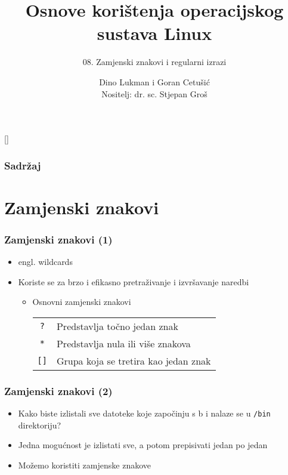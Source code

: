 \documentclass[table,usenames,dvipsnames]{beamer}
\title{Osnove korištenja operacijskog sustava Linux}
\subtitle{08. Zamjenski znakovi i regularni izrazi}
\author[Dino Lukman i Goran Cetušić]{Dino Lukman i Goran Cetušić\\{\small Nositelj: dr. sc. Stjepan Groš}}
\institute[FER]{Sveučilište u Zagrebu \\
				Fakultet elektrotehnike i računarstva}
\date{\todayiso}
\newcommand{\shell}[1]{\texttt{#1}}
\begin{document}
{
[] %

\begin{frame}
\maketitle
\end{frame}
}

\begin{frame}
\frametitle{Sadržaj}
\tableofcontents
\end{frame}

\section{Zamjenski znakovi}
\begin{frame}[t]
\frametitle{Zamjenski znakovi (1)}
\begin{itemize}
  \item engl. wildcards
  \item Koriste se za brzo i efikasno pretraživanje i izvršavanje naredbi
  \begin{itemize}
    \item Osnovni zamjenski znakovi
    \begin{tabular}{c l}
      \shell{?}   & Predstavlja točno jedan znak \\
      \shell{*}   & Predstavlja nula ili više znakova       \\
      \shell{[]}  & Grupa koja se tretira kao jedan znak
    \end{tabular}
  \end{itemize}  
\end{itemize}
\end{frame}

\begin{frame}[t]
\frametitle{Zamjenski znakovi (2)}
\begin{itemize}
  \item Kako biste izlistali sve datoteke koje započinju s b i nalaze se u
        \shell{/bin} direktoriju?
  \item Jedna mogućnost je izlistati sve, a potom prepisivati jedan po 
        jedan
  \item Možemo koristiti zamjenske znakove  
\end{itemize}
\end{frame}
\end{document}

